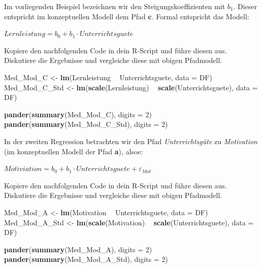 \documentclass[]{article}
\newenvironment{Shaded}{\begin{snugshade}}{\end{snugshade}}
\newcommand{\DataTypeTok}[1]{\textcolor[rgb]{0.13,0.29,0.53}{#1}}
\newcommand{\DecValTok}[1]{\textcolor[rgb]{0.00,0.00,0.81}{#1}}
\newcommand{\KeywordTok}[1]{\textcolor[rgb]{0.13,0.29,0.53}{\textbf{#1}}}
\newcommand{\NormalTok}[1]{#1}
\newcommand{\OperatorTok}[1]{\textcolor[rgb]{0.81,0.36,0.00}{\textbf{#1}}}
\newcommand{\StringTok}[1]{\textcolor[rgb]{0.31,0.60,0.02}{#1}}
\begin{document}
Im vorliegenden Beispiel bezeichnen wir den Steigungskoeffizienten mit \(b_1\). Dieser entspricht im konzeptuellen Modell dem Pfad \textbf{c}. Formal entspricht das Modell:

\(Lernleistung = b_0 + b_1 \cdot Unterrichtsguete\)

Kopiere den nachfolgenden Code in dein R-Script und führe diesen aus. Diskutiere die Ergebnisse und vergleiche diese mit obigen Pfadmodell.

\begin{Shaded}
\begin{Highlighting}[]
\NormalTok{    Med_Mod_C     <-}\StringTok{ }\KeywordTok{lm}\NormalTok{(Lernleistung }\OperatorTok{~}\StringTok{ }\NormalTok{Unterrichtsguete, }\DataTypeTok{data =}\NormalTok{ DF)}
\NormalTok{    Med_Mod_C_Std <-}\StringTok{ }\KeywordTok{lm}\NormalTok{(}\KeywordTok{scale}\NormalTok{(Lernleistung) }\OperatorTok{~}\StringTok{ }\KeywordTok{scale}\NormalTok{(Unterrichtsguete), }\DataTypeTok{data =}\NormalTok{ DF)}
    
    \KeywordTok{pander}\NormalTok{(}\KeywordTok{summary}\NormalTok{(Med_Mod_C), }\DataTypeTok{digits =} \DecValTok{2}\NormalTok{)}
    \KeywordTok{pander}\NormalTok{(}\KeywordTok{summary}\NormalTok{(Med_Mod_C_Std), }\DataTypeTok{digits =} \DecValTok{2}\NormalTok{)}
\end{Highlighting}
\end{Shaded}

In der zweiten Regression betrachten wir den Pfad \emph{Unterrichtsgüte} zu \emph{Motivation} (im konzeptuellen Modell der Pfad \textbf{a}), alsoe:

\(Motiviation = b_0 + b_1 \cdot Unterrichtsguete + \varepsilon_{Mot}\)

Kopiere den nachfolgenden Code in dein R-Script und führe diesen aus. Diskutiere die Ergebnisse und vergleiche diese mit obigen Pfadmodell.

\begin{Shaded}
\begin{Highlighting}[]
\NormalTok{    Med_Mod_A     <-}\StringTok{ }\KeywordTok{lm}\NormalTok{(Motivation }\OperatorTok{~}\StringTok{ }\NormalTok{Unterrichtsguete, }\DataTypeTok{data =}\NormalTok{ DF)}
\NormalTok{    Med_Mod_A_Std <-}\StringTok{ }\KeywordTok{lm}\NormalTok{(}\KeywordTok{scale}\NormalTok{(Motivation) }\OperatorTok{~}\StringTok{ }\KeywordTok{scale}\NormalTok{(Unterrichtsguete), }\DataTypeTok{data =}\NormalTok{ DF)}
    
    \KeywordTok{pander}\NormalTok{(}\KeywordTok{summary}\NormalTok{(Med_Mod_A), }\DataTypeTok{digits =} \DecValTok{2}\NormalTok{)}
    \KeywordTok{pander}\NormalTok{(}\KeywordTok{summary}\NormalTok{(Med_Mod_A_Std), }\DataTypeTok{digits =} \DecValTok{2}\NormalTok{)}
\end{Highlighting}
\end{Shaded}
\end{document}
